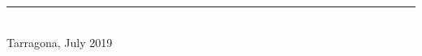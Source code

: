 \documentclass[b5paper, 12pt, openany, twoside, titlepage]{book} %
\begin{document}
\begin{titlepage}
\begin{center}
			\rule{4cm}{1pt}\\
			\bigskip
			Tarragona, July 2019\\

		\end{center}
\end{titlepage}












\pagestyle{empty}%

%
%
%
%
%
%

\cleardoublepage

%
\end{document}
